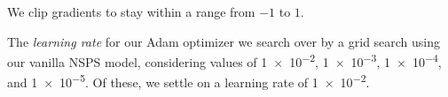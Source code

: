 \documentclass{article}
\begin{document}
We clip gradients to stay within a range from $-1$ to $1$.




The \emph{learning rate} for our Adam optimizer we search over
by a grid search using our vanilla NSPS model, considering
values of \num{1e-2}, \num{1e-3}, \num{1e-4}, and \num{1e-5}.
Of these, we settle on a learning rate of \num{1e-2}.
\end{document}
